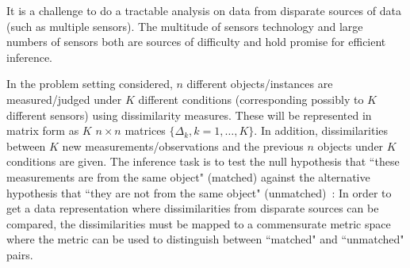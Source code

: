 \documentclass[11pt]{article} %
\begin{document}
 It is a challenge  to do a tractable analysis on data from disparate sources of data (such as multiple sensors). The multitude  of sensors technology and large numbers of sensors both are  sources of difficulty and hold promise for efficient inference.

In the problem setting considered, $n$ different objects/instances are measured/judged under $K$ different conditions (corresponding possibly to $K$ different sensors) using  dissimilarity measures. These will be represented in matrix form as $K$ $n \times n$ matrices $\{\Delta_k,k=1 ,\ldots,K\}$.  In addition,  dissimilarities between  $K$ new measurements/observations  and the previous 
$n$ objects under $K$ conditions are given. The inference task is to    test the null hypothesis  that ``these measurements are from the same  object"  (matched) against the alternative hypothesis that ``they are not  from the same  object" (unmatched)~\cite{JOFC}:
  In order to get a data representation where dissimilarities from disparate sources can be compared, the dissimilarities must be mapped to a commensurate metric space where the metric can be used to distinguish between ``matched" and ``unmatched" pairs.
\end{document}
